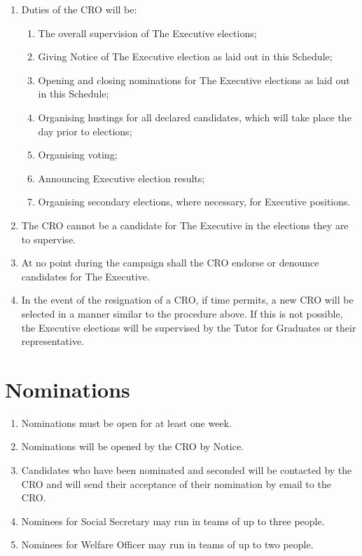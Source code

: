 \documentclass[11pt, a4paper]{article}
\begin{document}
\begin{enumerate}
	\item Duties of the CRO will be:
    	\begin{enumerate}
        	\item The overall supervision of The Executive elections;
            \item Giving Notice of The Executive election as laid out in this Schedule;
            \item Opening and closing nominations for The Executive elections as laid out in this Schedule;
            \item Organising hustings for all declared candidates, which will take place the day prior to elections;
            \item Organising voting;
            \item Announcing Executive election results;
            \item Organising secondary elections, where necessary, for Executive positions.
        \end{enumerate}
    \item The CRO cannot be a candidate for The Executive in the elections they are to supervise.
    \item At no point during the campaign shall the CRO endorse or denounce candidates for The Executive.
    \item In the event of the resignation of a CRO, if time permits, a new CRO will be selected in a manner similar to the procedure above. If this is not possible, the  Executive elections will be supervised by the Tutor for Graduates or their representative.
\end{enumerate}





\section{Nominations}
\label{sec:nominations}

\begin{enumerate}
	\item Nominations must be open for at least one week.
    \item Nominations will be opened by the CRO  by Notice.
    \item Candidates who have been nominated and seconded will be contacted by the CRO and will send their acceptance of their nomination by email to the CRO.
    \item Nominees for Social Secretary may run in teams of up to three people.
    \item Nominees for Welfare Officer may run in teams of up to two people.
\end{enumerate}
\end{document}
